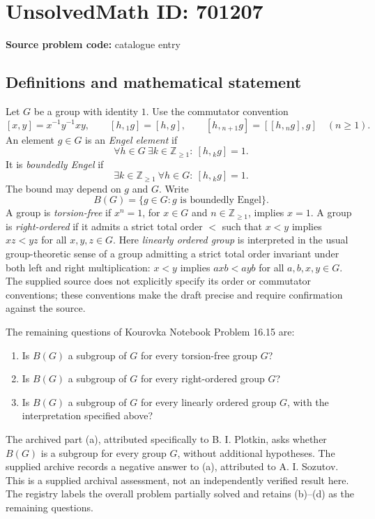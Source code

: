 \documentclass[11pt]{article}
\newcommand{\Z}{\mathbb{Z}}
\begin{document}
\section*{UnsolvedMath ID: 701207}
\textbf{Source problem code:} catalogue entry
\subsection{Definitions and mathematical statement}
Let \(G\) be a group with identity \(1\). Use the commutator convention
\[
[x,y]=x^{-1}y^{-1}xy,\qquad [h,{}_1g]=[h,g],\qquad [h,{}_{n+1}g]=[[h,{}_ng],g]\quad(n\geq1).
\]
An element \(g\in G\) is an \emph{Engel element} if
\[
\forall h\in G\ \exists k\in\Z_{\geq1}:\ [h,{}_kg]=1.
\]
It is \emph{boundedly Engel} if
\[
\exists k\in\Z_{\geq1}\ \forall h\in G:\ [h,{}_kg]=1.
\]
The bound may depend on \(g\) and \(G\). Write
\[
B(G)=\{g\in G:g\text{ is boundedly Engel}\}.
\]
A group is \emph{torsion-free} if \(x^n=1\), for \(x\in G\) and \(n\in\Z_{\geq1}\), implies \(x=1\). A group is \emph{right-ordered} if it admits a strict total order \(<\) such that \(x<y\) implies \(xz<yz\) for all \(x,y,z\in G\). Here \emph{linearly ordered group} is interpreted in the usual group-theoretic sense of a group admitting a strict total order invariant under both left and right multiplication: \(x<y\) implies \(axb<ayb\) for all \(a,b,x,y\in G\). The supplied source does not explicitly specify its order or commutator conventions; these conventions make the draft precise and require confirmation against the source.

The remaining questions of Kourovka Notebook Problem 16.15 are:
\begin{enumerate}
\item[(b)] Is \(B(G)\) a subgroup of \(G\) for every torsion-free group \(G\)?
\item[(c)] Is \(B(G)\) a subgroup of \(G\) for every right-ordered group \(G\)?
\item[(d)] Is \(B(G)\) a subgroup of \(G\) for every linearly ordered group \(G\), with the interpretation specified above?
\end{enumerate}
The archived part (a), attributed specifically to B. I. Plotkin, asks whether \(B(G)\) is a subgroup for every group \(G\), without additional hypotheses. The supplied archive records a negative answer to (a), attributed to A. I. Sozutov. This is a supplied archival assessment, not an independently verified result here. The registry labels the overall problem partially solved and retains (b)--(d) as the remaining questions.
\end{document}
